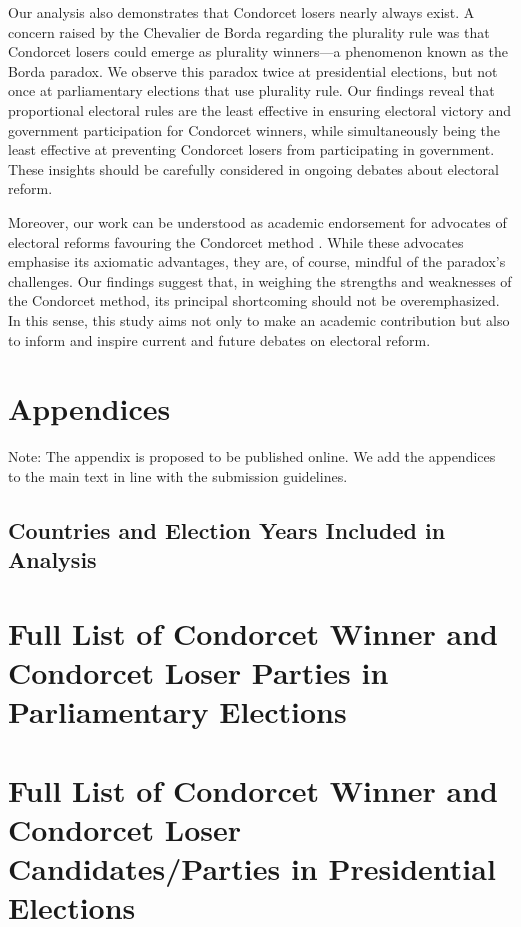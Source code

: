 \documentclass[12pt]{scrartcl}
\begin{document}
Our analysis also demonstrates that Condorcet losers nearly always exist. A concern raised by the Chevalier de Borda regarding the plurality rule was that Condorcet losers could emerge as plurality winners—a phenomenon known as the Borda paradox. We observe this paradox twice at presidential elections, but not once at parliamentary elections that use plurality rule. Our findings reveal that proportional electoral rules are the least effective in ensuring electoral victory and government participation for Condorcet winners, while simultaneously being the least effective at preventing Condorcet losers from participating in government. These insights should be carefully considered in ongoing debates about electoral reform.

Moreover, our work can be understood as academic endorsement for advocates of electoral reforms favouring the Condorcet method \citep{Maskin2016, Maskin2017, Maskin2017a}. While these advocates emphasise its axiomatic advantages, they are, of course, mindful of the paradox's challenges. Our findings suggest that, in weighing the strengths and weaknesses of the Condorcet method, its principal shortcoming should not be overemphasized. In this sense, this study aims not only to make an academic contribution but also to inform and inspire current and future debates on electoral reform.

\singlespacing
%


%

\appendix
\section*{Appendices}

Note: The appendix is  proposed to be published online. We add the appendices to the main text in line with the submission guidelines. 

\singlespacing
\newpage
\begin{landscape}
\section{Countries and Election Years Included in Analysis}

\end{landscape}
	
\section{Full List of Condorcet Winner and Condorcet Loser Parties in Parliamentary Elections}
%	
	
\section{Full List of Condorcet Winner and Condorcet Loser Candidates/Parties in Presidential Elections}

%
\end{document}
